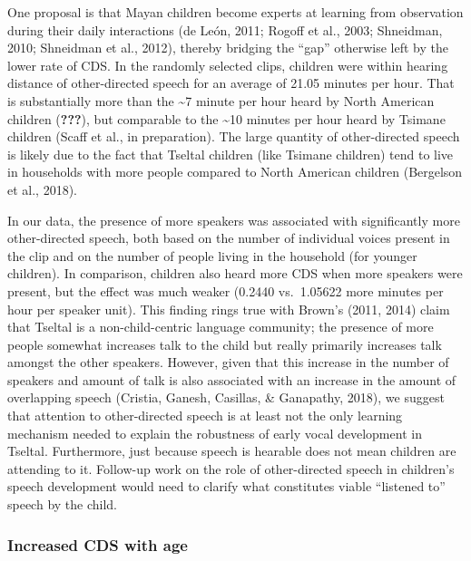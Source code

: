 \documentclass[floatsintext,man]{apa6}
\theoremstyle{definition}
\theoremstyle{definition}
\theoremstyle{definition}
\theoremstyle{remark}
\begin{document}
One proposal is that Mayan children become experts at learning from
observation during their daily interactions (de León, 2011; Rogoff et
al., 2003; Shneidman, 2010; Shneidman et al., 2012), thereby bridging
the \enquote{gap} otherwise left by the lower rate of CDS. In the
randomly selected clips, children were within hearing distance of
other-directed speech for an average of 21.05 minutes per hour. That is
substantially more than the \textasciitilde{}7 minute per hour heard by
North American children ({\textbf{???}}), but comparable to the
\textasciitilde{}10 minutes per hour heard by Tsimane children (Scaff et
al., in preparation). The large quantity of other-directed speech is
likely due to the fact that Tseltal children (like Tsimane children)
tend to live in households with more people compared to North American
children (Bergelson et al., 2018).

In our data, the presence of more speakers was associated with
significantly more other-directed speech, both based on the number of
individual voices present in the clip and on the number of people living
in the household (for younger children). In comparison, children also
heard more CDS when more speakers were present, but the effect was much
weaker (0.2440 vs.~1.05622 more minutes per hour per speaker unit). This
finding rings true with Brown's (2011, 2014) claim that Tseltal is a
non-child-centric language community; the presence of more people
somewhat increases talk to the child but really primarily increases talk
amongst the other speakers. However, given that this increase in the
number of speakers and amount of talk is also associated with an
increase in the amount of overlapping speech (Cristia, Ganesh, Casillas,
\& Ganapathy, 2018), we suggest that attention to other-directed speech
is at least not the only learning mechanism needed to explain the
robustness of early vocal development in Tseltal. Furthermore, just
because speech is hearable does not mean children are attending to it.
Follow-up work on the role of other-directed speech in children's speech
development would need to clarify what constitutes viable
\enquote{listened to} speech by the child.

\subsubsection{Increased CDS with age}\label{increased-cds-with-age}
\end{document}
